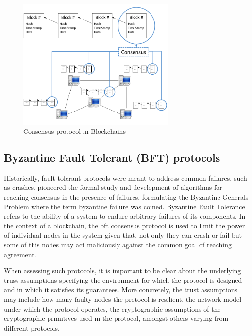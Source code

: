 \begin{figure}
    \centering
    \includegraphics[width=0.7\textwidth]{img/Key-Elements-of-Blockchain-Systems.png}
    \caption{Consensus protocol in Blockchains \citep{blockchainConsensusImg}}
    \label{fig:blockchainConsensus}
\end{figure}


\subsection{Byzantine Fault Tolerant (BFT) protocols}
Historically, fault-tolerant protocols were meant to address common failures, such as crashes.  \cite{Lamport:1982:BGP:357172.357176} pioneered the formal study and development of algorithms for reaching consensus in the presence of failures, formulating the Byzantine Generals Problem where the term byzantine failure was coined. Byzantine Fault Tolerance refers to the ability of a system to endure arbitrary failures of its components. 
In the context of a blockchain, the \gls{bft} consensus protocol is used to limit the power of individual nodes in the system given that, not only they can crash or fail but some of this nodes may act maliciously against the common goal of reaching agreement.

When assessing such protocols, it is important to be clear about the underlying trust assumptions specifying the environment for which the protocol is designed and in which it satisfies its guarantees. More concretely, the trust assumptions may include how many faulty nodes the protocol is resilient, the network model under which the protocol operates, the cryptographic assumptions of the cryptographic primitives used in the protocol, amongst others varying from different protocols. 

